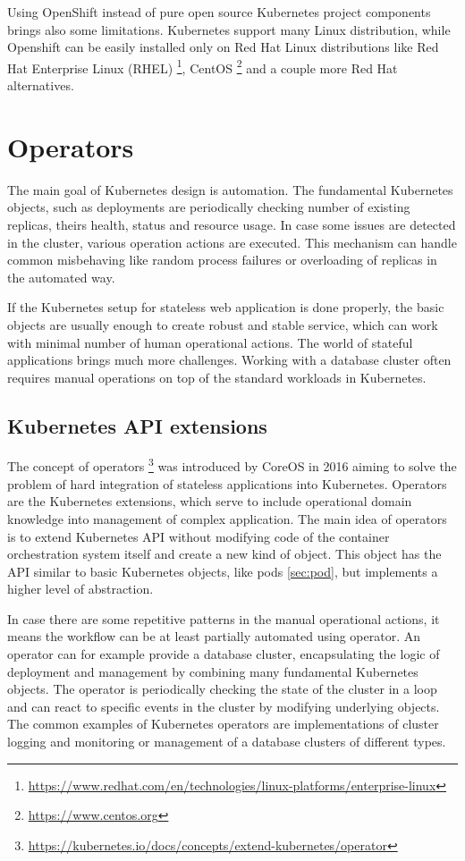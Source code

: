 \documentclass[
  digital, %
  twoside, %
  table,   %
  lof,     %
  lot,     %
]{fithesis3}
\begin{document}
Using OpenShift instead of pure open source Kubernetes project components brings also some limitations. Kubernetes support many Linux distribution, while Openshift can be easily installed only on Red Hat Linux distributions like Red Hat Enterprise Linux (RHEL) \footnote{\url{https://www.redhat.com/en/technologies/linux-platforms/enterprise-linux}}, CentOS \footnote{\url{https://www.centos.org}} and a couple more Red Hat alternatives.

\section{Operators} \label{sec:operators}
The main goal of Kubernetes design is automation. The fundamental Kubernetes objects, such as deployments are periodically checking number of existing replicas, theirs health, status and resource usage. In case some issues are detected in the cluster, various operation actions are executed. This mechanism can handle common misbehaving like random process failures or overloading of replicas in the automated way.

If the Kubernetes setup for stateless web application is done properly, the basic objects are usually enough to create robust and stable service, which can work with minimal number of human operational actions. The world of stateful applications brings much more challenges. Working with a database cluster often requires manual operations on top of the standard workloads in Kubernetes.

\subsection{Kubernetes API extensions}
The concept of operators \footnote{\url{https://kubernetes.io/docs/concepts/extend-kubernetes/operator}} was introduced by CoreOS \cite{operators} in 2016 aiming to solve the problem of hard integration of stateless applications into Kubernetes. Operators  are the Kubernetes extensions, which serve to include operational domain knowledge into management of complex application. The main idea of operators is to extend Kubernetes API without modifying code of the container orchestration system itself and create a new kind of object. This object has the API similar to basic Kubernetes objects, like pods \ref{sec:pod}, but implements a higher level of abstraction.

In case there are some repetitive patterns in the manual operational actions, it means the workflow can be at least partially automated using operator. An operator can for example provide a database cluster, encapsulating the logic of deployment and management by combining many fundamental Kubernetes objects. The operator is periodically checking the state of the cluster in a loop and can react to specific events in the cluster by modifying underlying objects. The common examples of Kubernetes operators are implementations of cluster logging and monitoring or management of a database clusters of different types.
\end{document}
